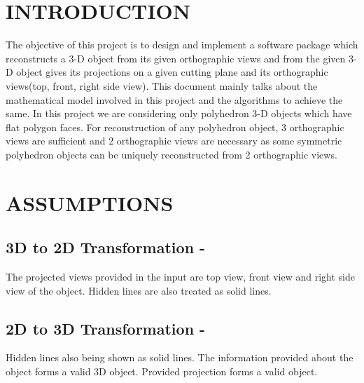 \hypertarget{index_intro_sec}{}\section{I\+N\+T\+R\+O\+D\+U\+C\+T\+I\+ON}\label{index_intro_sec}
The objective of this project is to design and implement a software package which reconstructs a 3-\/D object from its given orthographic views and from the given 3-\/D object gives its projections on a given cutting plane and its orthographic views(top, front, right side view). This document mainly talks about the mathematical model involved in this project and the algorithms to achieve the same. In this project we are considering only polyhedron 3-\/D objects which have flat polygon faces. For reconstruction of any polyhedron object, 3 orthographic views are sufficient and 2 orthographic views are necessary as some symmetric polyhedron objects can be uniquely reconstructed from 2 orthographic views.\hypertarget{index_assumption_sec}{}\section{A\+S\+S\+U\+M\+P\+T\+I\+O\+NS}\label{index_assumption_sec}
\hypertarget{index_subsection1}{}\subsection{3\+D to 2\+D Transformation -\/}\label{index_subsection1}
The projected views provided in the input are top view, front view and right side view of the object. Hidden lines are also treated as solid lines. \hypertarget{index_subsection2}{}\subsection{2\+D to 3\+D Transformation -\/}\label{index_subsection2}
Hidden lines also being shown as solid lines. The information provided about the object forms a valid 3D object. Provided projection forms a valid object. 